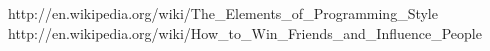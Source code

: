 \begin{center}
                      {http://en.wikipedia.org/wiki/The_Elements_of_Programming_Style}
                      {http://en.wikipedia.org/wiki/How_to_Win_Friends_and_Influence_People}
\end{center}
